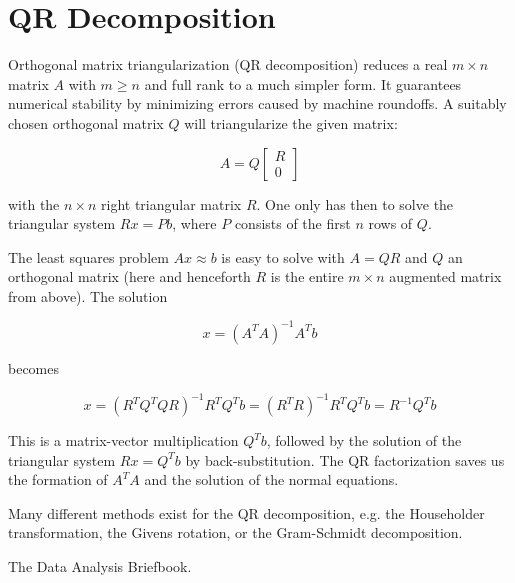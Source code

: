 \documentclass{article}
\begin{document}
\section{QR Decomposition}

Orthogonal matrix triangularization (QR decomposition) reduces a real $m \times n$ matrix $A$ with $m \ge n$  and full rank to a much simpler form. It guarantees numerical stability by minimizing errors caused by machine roundoffs. A suitably chosen orthogonal matrix $Q$ will triangularize the given matrix:

$$ A = Q \begin{bmatrix} R \\ 0 \end{bmatrix} $$

with the $n \times n$ right triangular matrix $R$. One only has then to solve the triangular system $Rx = Pb$, where $P$ consists of the first $n$ rows of $Q$.

The least squares problem $Ax \approx b$ is easy to solve with $A = QR$ and $Q$ an orthogonal matrix (here and henceforth $R$ is the entire $ m \times n $ augmented matrix from above). The solution

$$ x = (A^TA)^{-1} A^Tb $$

becomes

$$ x = (R^TQ^TQR)^{-1}R^TQ^Tb = (R^TR)^{-1}R^TQ^Tb = R^{-1}Q^Tb $$

This is a matrix-vector multiplication $Q^Tb$, followed by the solution of the triangular system $Rx = Q^Tb$ by back-substitution. The QR factorization saves us the formation of $A^TA$ and the solution of the normal equations.

Many different methods exist for the QR decomposition, e.g. the Householder transformation, the Givens rotation, or the Gram-Schmidt decomposition.

\begin{thebibliography}{3}

 The Data Analysis Briefbook. 

\end{thebibliography}
\end{document}
